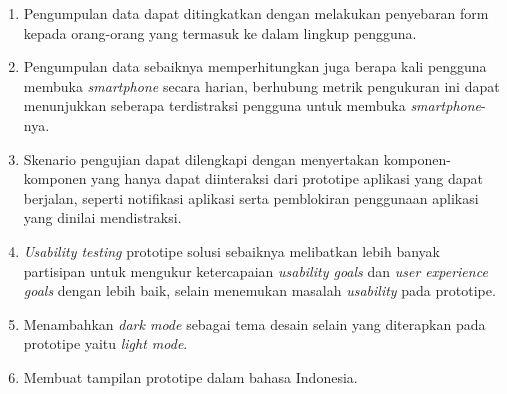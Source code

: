 \begin{enumerate}
  \item Pengumpulan data dapat ditingkatkan dengan melakukan penyebaran form kepada orang-orang yang termasuk ke dalam lingkup pengguna.
  \item Pengumpulan data sebaiknya memperhitungkan juga berapa kali pengguna membuka \textit{smartphone} secara harian, berhubung metrik pengukuran ini dapat menunjukkan seberapa terdistraksi pengguna untuk membuka \textit{smartphone}-nya.
  \item Skenario pengujian dapat dilengkapi dengan menyertakan komponen-komponen yang hanya dapat diinteraksi dari prototipe aplikasi yang dapat berjalan, seperti notifikasi aplikasi serta pemblokiran penggunaan aplikasi yang dinilai mendistraksi.
  \item \textit{Usability testing} prototipe solusi sebaiknya melibatkan lebih banyak partisipan untuk mengukur ketercapaian \textit{usability goals} dan \textit{user experience goals} dengan lebih baik, selain menemukan masalah \textit{usability} pada prototipe.
  \item Menambahkan \textit{dark mode} sebagai tema desain selain yang diterapkan pada prototipe yaitu \textit{light mode}.
  \item Membuat tampilan prototipe dalam bahasa Indonesia.
\end{enumerate}
